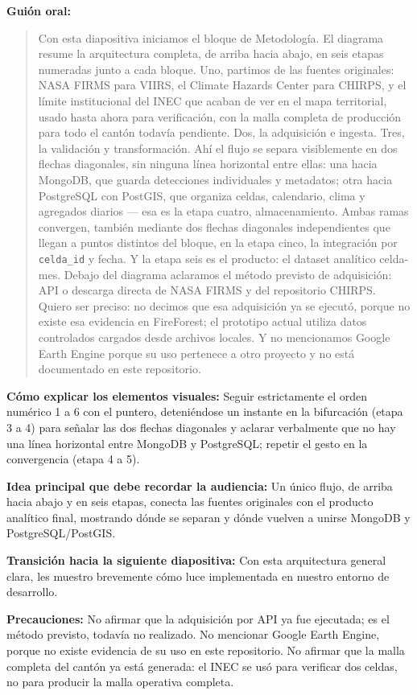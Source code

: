 \documentclass[11pt,a4paper]{article}
\newcommand{\campo}[2]{\par\medskip\noindent\textbf{#1:} #2\par}
\newenvironment{guionoral}{%
  \medskip\noindent\textbf{Gui\'on oral:}\par\smallskip
  \begin{quote}\small
}{%
  \end{quote}
}
\begin{document}
\begin{guionoral}
Con esta diapositiva iniciamos el bloque de Metodolog\'ia. El diagrama
resume la arquitectura completa, de arriba hacia abajo, en seis
etapas numeradas junto a cada bloque. Uno, partimos de las fuentes
originales: NASA FIRMS para VIIRS, el Climate Hazards Center para
CHIRPS, y el l\'imite institucional del INEC que acaban de ver en el
mapa territorial, usado hasta ahora para verificaci\'on, con la malla
completa de producci\'on para todo el cant\'on todav\'ia pendiente.
Dos, la adquisici\'on e ingesta. Tres, la validaci\'on
y transformaci\'on. Ah\'i el flujo se separa visiblemente en dos
flechas diagonales, sin ninguna l\'inea horizontal entre ellas: una
hacia MongoDB, que guarda detecciones individuales y metadatos; otra
hacia PostgreSQL con PostGIS, que organiza celdas, calendario, clima y
agregados diarios --- esa es la etapa cuatro, almacenamiento. Ambas
ramas convergen, tambi\'en mediante dos flechas diagonales
independientes que llegan a puntos distintos del bloque, en la etapa
cinco, la integraci\'on por \texttt{celda\_id} y fecha. Y la etapa seis
es el producto: el dataset anal\'itico celda-mes. Debajo del diagrama
aclaramos el m\'etodo previsto de adquisici\'on: API o descarga
directa de NASA FIRMS y del repositorio CHIRPS. Quiero ser preciso: no
decimos que esa adquisici\'on ya se ejecut\'o, porque no existe esa
evidencia en FireForest; el prototipo actual utiliza datos controlados
cargados desde archivos locales. Y no mencionamos Google Earth Engine
porque su uso pertenece a otro proyecto y no est\'a documentado en
este repositorio.
\end{guionoral}

\campo{C\'omo explicar los elementos visuales}{Seguir estrictamente el
orden num\'erico 1 a 6 con el puntero, deteni\'endose un instante en la
bifurcaci\'on (etapa 3 a 4) para se\~nalar las dos flechas diagonales y
aclarar verbalmente que no hay una l\'inea horizontal entre MongoDB y
PostgreSQL; repetir el gesto en la convergencia (etapa 4 a 5).}
\campo{Idea principal que debe recordar la audiencia}{Un \'unico flujo,
de arriba hacia abajo y en seis etapas, conecta las fuentes originales
con el producto anal\'itico final, mostrando d\'onde se separan y
d\'onde vuelven a unirse MongoDB y PostgreSQL/PostGIS.}
\campo{Transici\'on hacia la siguiente diapositiva}{Con esta
arquitectura general clara, les muestro brevemente c\'omo luce
implementada en nuestro entorno de desarrollo.}
\campo{Precauciones}{No afirmar que la adquisici\'on por API ya fue
ejecutada; es el m\'etodo previsto, todav\'ia no realizado. No
mencionar Google Earth Engine, porque no existe evidencia de su uso en
este repositorio. No afirmar que la malla completa del cant\'on ya
est\'a generada: el INEC se us\'o para verificar dos celdas, no para
producir la malla operativa completa.}
\end{document}
